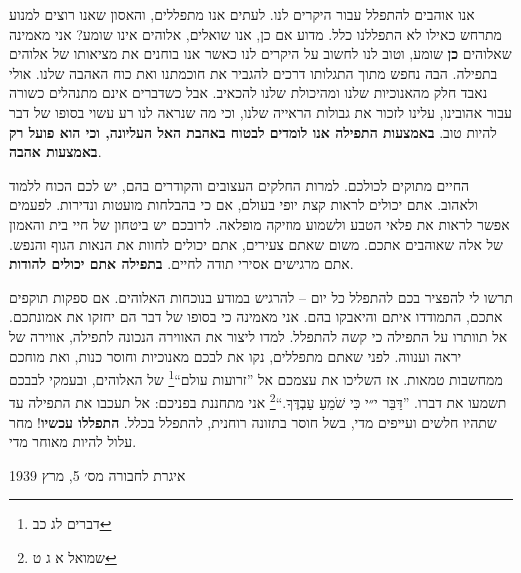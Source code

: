 \documentclass[14pt, article, extrafontsizes, twopage, a4paper]{memoir}
\newcommand{\attr}[1]{
  \vspace*{.25\baselineskip}
  {\raggedright\smaller#1


  }
}
\begin{document}
{אנו אוהבים להתפלל עבור היקרים לנו. לעתים אנו מתפללים, והאסון שאנו רוצים למנוע מתרחש כאילו לא התפללנו כלל. מדוע אם כן, אנו שואלים, אלוהים אינו שומע? אני מאמינה שאלוהים \textbf {כן} שומע, וטוב לנו לחשוב על היקרים לנו כאשר אנו בוחנים את מציאותו של אלוהים בתפילה. הבה נחפש מתוך התגלותו דרכים להגביר את חוכמתנו ואת כוח האהבה שלנו. אולי נאבד חלק מהאנוכיות שלנו ומהיכולת שלנו להכאיב. אבל כשדברים אינם מתנהלים כשורה עבור אהובינו, עלינו לזכור את גבולות הראייה שלנו, וכי מה שנראה לנו רע עשוי בסופו של דבר להיות טוב. \textbf{באמצעות התפילה אנו לומדים לבטוח באהבת האל העליונה, וכי הוא פועל רק באמצעות אהבה}.

החיים מתוקים לכולכם. למרות החלקים העצובים והקודרים בהם, יש לכם הכוח ללמוד ולאהוב. אתם יכולים לראות קצת יופי בעולם, אם כי בהבלחות מועטות ונדירות. לפעמים אפשר לראות את פלאי הטבע ולשמוע מוזיקה מופלאה. לרובכם יש ביטחון של חיי בית והאמון של אלה שאוהבים אתכם. משום שאתם צעירים, אתם יכולים לחוות את הנאות הגוף והנפש. אתם מרגישים אסירי תודה לחיים. \textbf{בתפילה אתם יכולים להודות}.

תרשו לי להפציר בכם להתפלל כל יום -- להרגיש במודע בנוכחות האלוהים. אם ספקות תוקפים אתכם, התמודדו איתם והיאבקו בהם. אני מאמינה כי בסופו של דבר הם יחזקו את אמונתכם. אל תוותרו על התפילה כי קשה להתפלל. למדו ליצור את האווירה הנכונה לתפילה, אווירה של יראה וענווה. לפני שאתם מתפללים, נקו את לבכם מאנוכיות וחוסר כנות, ואת מוחכם ממחשבות טמאות. אז השליכו את עצמכם אל ”זרועות עולם“\footnote{דברים לג כב} של האלוהים, ובעמקי לבבכם תשמעו את דברו. ”דַּבֵּר י״י כִּי שֹׁמֵעַ עַבְדֶּךָ.“\footnote{שמואל א ג ט} אני מתחננת בפניכם: אל תעכבו את התפילה עד שתהיו חלשים ועייפים מדי, בשל חוסר בתזונה רוחנית, להתפלל בכלל. \textbf{התפללו עכשיו}! מחר עלול להיות מאוחר מדי.

\attr{איגרת לחבורה מס׳ 5, מרץ 1939}
}
\end{document}
